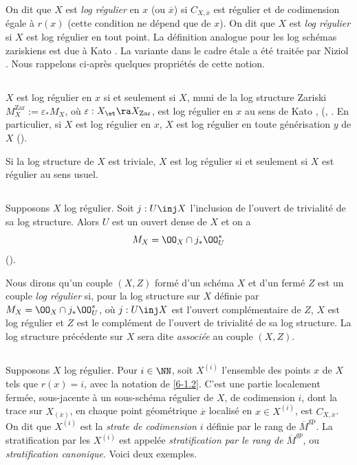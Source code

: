 \documentclass[10pt]{../fichiers-configuration-latex/smfart}
\begin{document}
On dit que $X$ est \textit{log régulier} en $x$ (ou $\overline{x}$) si $C_{X,\overline{x}}$ est
régulier et de codimension égale à $r(x)$ (cette condition ne dépend que de $x$). On dit que $X$ est
\textit{log régulier} si $X$ est log régulier en tout point. La définition analogue pour les log
schémas zariskiens est due à Kato \cite{Toric@Kato}. La variante dans le cadre étale a été traitée
par Niziol \cite{Toric@Niziol}. Nous rappelons ci-après quelques propriétés de cette notion.
\subsection{}\label{6-1.3} $X$ est log régulier en $x$ si et seulement si $X$, muni de la log
structure Zariski $M_X^{\mathrm{Zar}} := \varepsilon_*M_X$, où $\varepsilon : X_{\mathrm{\et}} \ra
X_{\mathrm{Zar}}$, est log régulier en $x$ au sens de Kato \cite{Toric@Kato},
(\cite[4.6]{Saturated@Tsuji}, \cite[2.4]{Toric@Niziol}. En particulier, si  $X$ est log régulier en
$x$, $X$ est log régulier en toute générisation $y$ de $X$ (\cite[7.1]{Toric@Kato}).

Si la log structure de $X$ est triviale, $X$ est log régulier si et seulement si $X$ est régulier au
sens usuel.  \subsection{}\label{6-1.4} Supposons $X$ log régulier. Soit $j : U \inj X$ l'inclusion
de l'ouvert de trivialité de sa log structure. Alors $U$ est un ouvert dense de $X$ et on a $$ M_X =
\OO_X \cap j_*\OO_U^* $$ (\cite[2.6]{Toric@Niziol}).

Nous dirons qu'un couple $(X,Z)$ formé d'un schéma $X$ et d'un fermé $Z$ est un couple \textit{log
régulier} si, pour la log structure sur $X$ définie par $M_X = \OO_X \cap
j_*\OO_U^*$, où $j : U \inj X$ est l'ouvert complémentaire de $Z$, $X$ est log régulier et
$Z$ est le complément de l'ouvert de trivialité de sa log structure. La log structure précédente sur
$X$ sera dite \textit{associée} au couple $(X,Z)$.  \subsection{}\label{6-1.5} Supposons $X$ log
régulier. Pour $i \in \NN$, soit $X^{(i)}$ l'ensemble des points $x$ de $X$ tels que $r(x) =
i$, avec la notation de \ref{6-1.2}. C'est une partie localement fermée, sous-jacente à un
sous-schéma régulier de $X$, de codimension $i$, dont la trace sur $X_{(\overline{x})}$, en chaque
point géométrique $\overline{x}$ localisé en  $x \in X^{(i)}$, est $C_{X,\overline{x}}$. On dit que
$X^{(i)}$ est la \textit{strate de codimension} $i$ définie par le rang de
$\overline{M}^{\mathrm{gp}}$. La stratification par les $X^{(i)}$ est appelée \textit{stratification
par le rang de $\overline{M}^{gp}$}, ou \textit{stratification canonique}. Voici deux exemples. 
\end{document}
